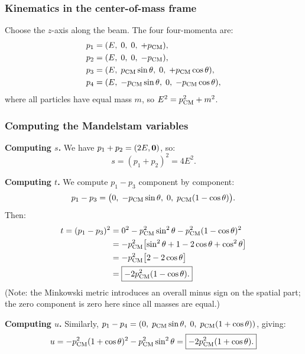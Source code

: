 \documentclass[../main.tex]{subfiles}
\begin{document}
\subsubsection*{Kinematics in the center-of-mass frame}

Choose the $z$-axis along the beam.  The four four-momenta are:
\begin{align}
  p_1 &= (E,\;0,\;0,\;+p_{\rm CM}), \label{eq:lec07:p1}\\
  p_2 &= (E,\;0,\;0,\;-p_{\rm CM}), \label{eq:lec07:p2}\\
  p_3 &= (E,\;p_{\rm CM}\sin\theta,\;0,\;+p_{\rm CM}\cos\theta), \label{eq:lec07:p3}\\
  p_4 &= (E,\;-p_{\rm CM}\sin\theta,\;0,\;-p_{\rm CM}\cos\theta), \label{eq:lec07:p4}
\end{align}
where all particles have equal mass $m$, so $E^2 = p_{\rm CM}^2 + m^2$.

\subsubsection*{Computing the Mandelstam variables}

\textbf{Computing $s$.}  We have $p_1+p_2 = (2E,\mathbf{0})$, so:
\begin{equation}
  s = (p_1+p_2)^2 = 4E^2.
  \label{eq:lec07:s-result}
\end{equation}

\textbf{Computing $t$.}  We compute $p_1 - p_3$ component by component:
\[
  p_1 - p_3 = \bigl(0,\; -p_{\rm CM}\sin\theta,\; 0,\; p_{\rm CM}(1-\cos\theta)\bigr).
\]
Then:
\begin{align}
  t = (p_1-p_3)^2
  &= 0^2 - p_{\rm CM}^2\sin^2\theta - p_{\rm CM}^2(1-\cos\theta)^2 \notag\\
  &= -p_{\rm CM}^2\bigl[\sin^2\theta + 1 - 2\cos\theta + \cos^2\theta\bigr] \notag\\
  &= -p_{\rm CM}^2\bigl[2 - 2\cos\theta\bigr] \notag\\
  &= \boxed{-2p_{\rm CM}^2(1-\cos\theta).}
  \label{eq:lec07:t-result}
\end{align}
(Note: the Minkowski metric introduces an overall minus sign on the spatial part; the zero component is zero here since all masses are equal.)

\textbf{Computing $u$.}  Similarly, $p_1 - p_4 = (0,\;p_{\rm CM}\sin\theta,\;0,\;p_{\rm CM}(1+\cos\theta))$, giving:
\begin{equation}
  u = -p_{\rm CM}^2(1+\cos\theta)^2 - p_{\rm CM}^2\sin^2\theta
  = \boxed{-2p_{\rm CM}^2(1+\cos\theta).}
  \label{eq:lec07:u-result}
\end{equation}
\end{document}
